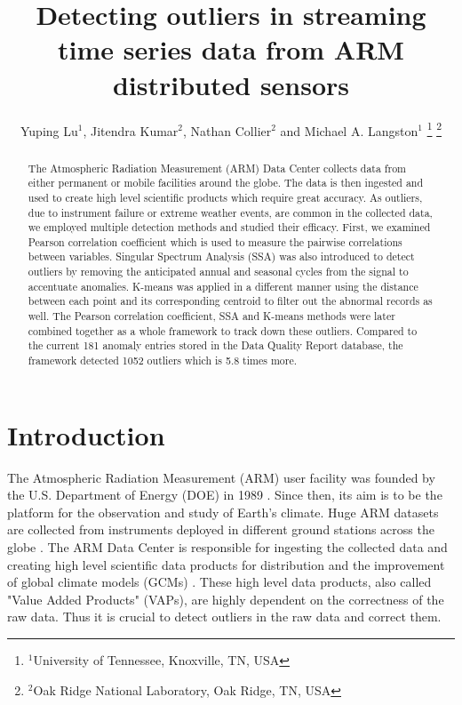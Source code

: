 \documentclass[letterpaper, 10 pt, conference]{ieeeconf}  %
\title{\LARGE \bf
Detecting outliers in streaming time series data from ARM distributed sensors
}
\author{Yuping Lu$^{1}$, Jitendra Kumar$^{2}$, Nathan Collier$^{2}$ and Michael A. Langston$^{1}$%
\thanks{$^{1}$University of Tennessee, Knoxville, TN, USA}%
\thanks{$^{2}$Oak Ridge National Laboratory, Oak Ridge, TN, USA}%
}
\begin{document}
\maketitle
\thispagestyle{empty}
\pagestyle{empty}

\begin{abstract}

The Atmospheric Radiation Measurement (ARM) Data Center collects data from either permanent or mobile facilities around the globe. The data is then ingested and used to create high level scientific products which require great accuracy. As outliers, due to instrument failure or extreme weather events, are common in the collected data, we employed multiple detection methods and studied their efficacy. First, we examined Pearson correlation coefficient which is used to measure the pairwise correlations between variables. Singular Spectrum Analysis (SSA) was also introduced to detect outliers by removing the anticipated annual and seasonal cycles from the signal to accentuate anomalies. K-means was applied in a different manner using the distance between each point and its corresponding centroid to filter out the abnormal records as well. The Pearson correlation coefficient, SSA and K-means methods were later combined together as a whole framework to track down these outliers. Compared to the current 181 anomaly entries stored in the Data Quality Report database, the framework detected 1052 outliers which is 5.8 times more.

\end{abstract}


\section{Introduction}
The Atmospheric Radiation Measurement (ARM) user facility was founded by the U.S. Department of Energy (DOE) in 1989 \cite{ARM}. Since then, its aim is to be the platform for the observation and study of Earth's climate. Huge ARM datasets are collected from instruments deployed in different ground stations across the globe \cite{stokes1994atmospheric}. The ARM Data Center is responsible for ingesting the collected data and creating high level scientific data products for distribution and the improvement of global climate models (GCMs) \cite{gaustad2014scientific}. These high level data products, also called "Value Added Products" (VAPs), are highly dependent on the correctness of the raw data. Thus it is crucial to detect outliers in the raw data and correct them.
\end{document}
